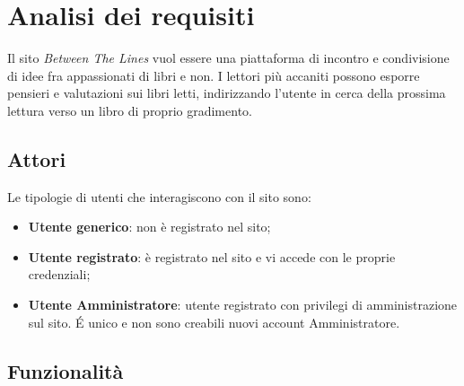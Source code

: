 \documentclass[12pt,a4paper,headings=optiontohead]{article}
\begin{document}
	\tableofcontents
	\newpage
	\section{Analisi dei requisiti}
	
	Il sito \textit{Between The Lines} vuol essere una piattaforma di incontro e condivisione di idee fra appassionati di libri e non. I lettori più accaniti possono esporre pensieri e valutazioni sui libri letti, indirizzando l'utente in cerca della prossima lettura verso un libro di proprio gradimento.
	
	
	\subsection{Attori}
	
	Le tipologie di utenti che interagiscono con il sito sono:
	\begin{itemize}
		\item \textbf{Utente generico}: non è registrato nel sito;
		\item \textbf{Utente registrato}: è registrato nel sito e vi accede con le proprie credenziali;
		\item \textbf{Utente Amministratore}: utente registrato con privilegi di amministrazione sul sito. \'E unico e non sono creabili nuovi account Amministratore. 
	\end{itemize} 
	
	
	\subsection{Funzionalità}
	
\end{document}
